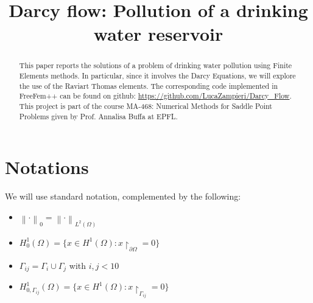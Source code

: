 \documentclass[conference]{IEEEtran}
\newcommand{\norm}[1]{\left\lVert#1\right\rVert}
\begin{document}
%
\title{Darcy flow: Pollution of a drinking water reservoir}

\author{
}

\maketitle
\vspace{-10cm}

\begin{abstract}
This paper reports the solutions of a problem of drinking water pollution using Finite Elements methods. In particular, since it involves the Darcy Equations, we will explore the use of the Raviart Thomas elements. The corresponding code implemented in FreeFem++ can be found on github: \url{https://github.com/LucaZampieri/Darcy_Flow}. This project is part of the course MA-468: Numerical Methods for Saddle Point Problems given by Prof. Annalisa Buffa at EPFL.

\end{abstract}
\IEEEpeerreviewmaketitle
\section{Notations}
We will use standard notation, complemented by the following:
\begin{itemize}
\item $\norm{\cdot}_0 = \norm{\cdot}_{L^2(\Omega)}$
\item $H^1_0(\Omega)= \{ x \in H^1(\Omega) : x{\restriction}_{\partial \Omega}=0 \}$
\item $\Gamma_{ij} = \Gamma_i \cup \Gamma_j$    with $ i,j < 10$
\item $H^1_{0,\Gamma_{ij}}(\Omega)= \{ x \in H^1(\Omega) : x{\restriction}_{\Gamma_{ij}}=0 \}$
\end{itemize}
\end{document}
